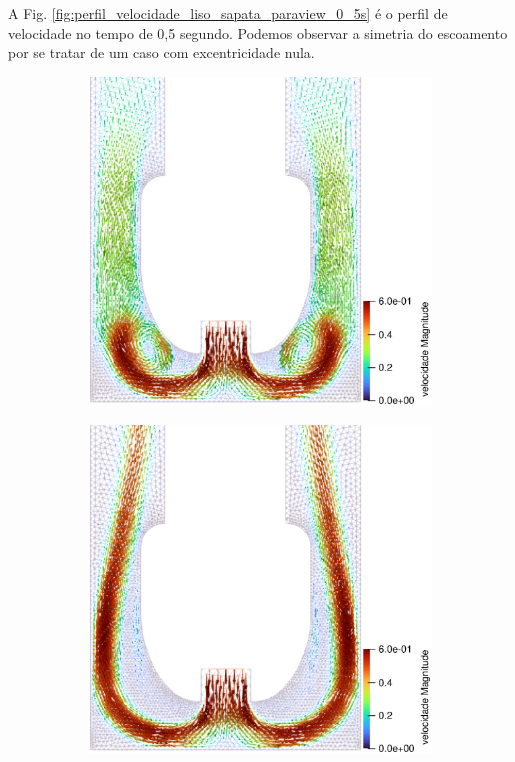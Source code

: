 A Fig. \ref{fig:perfil_velocidade_liso_sapata_paraview_0_5s} é o perfil de velocidade no tempo de 0,5 segundo. Podemos observar a simetria do escoamento por se tratar de um caso com excentricidade nula. 
\begin{figure}[H]
        \centering
        \begin{subfigure}[b]{0.42\linewidth}
    		\includegraphics[width=\linewidth]{img/perfil_vel/liso/perfil_de_vel_sapata_paraview_0.5s.eps}
    	\end{subfigure}
    	\begin{subfigure}[b]{0.42\linewidth}
    		\includegraphics[width=\linewidth]{img/perfil_vel/liso/perfil_de_vel_sapata_paraview_10s.eps}
    	\end{subfigure}
    	

\end{figure}
